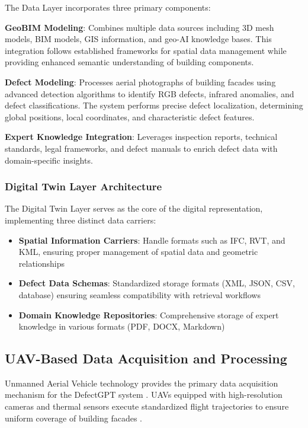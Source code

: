 The Data Layer incorporates three primary components:

\textbf{GeoBIM Modeling}: Combines multiple data sources including 3D mesh models, BIM models, GIS information, and geo-AI knowledge bases. This integration follows established frameworks for spatial data management while providing enhanced semantic understanding of building components.

\textbf{Defect Modeling}: Processes aerial photographs of building facades using advanced detection algorithms to identify RGB defects, infrared anomalies, and defect classifications. The system performs precise defect localization, determining global positions, local coordinates, and characteristic defect features.

\textbf{Expert Knowledge Integration}: Leverages inspection reports, technical standards, legal frameworks, and defect manuals to enrich defect data with domain-specific insights.

\subsubsection{Digital Twin Layer Architecture}

The Digital Twin Layer serves as the core of the digital representation, implementing three distinct data carriers:

\begin{itemize}
    \item \textbf{Spatial Information Carriers}: Handle formats such as IFC, RVT, and KML, ensuring proper management of spatial data and geometric relationships
    \item \textbf{Defect Data Schemas}: Standardized storage formats (XML, JSON, CSV, database) ensuring seamless compatibility with retrieval workflows
    \item \textbf{Domain Knowledge Repositories}: Comprehensive storage of expert knowledge in various formats (PDF, DOCX, Markdown)
\end{itemize}

\subsection{UAV-Based Data Acquisition and Processing}

Unmanned Aerial Vehicle technology provides the primary data acquisition mechanism for the DefectGPT system \cite{ribeiro2020remote,tan2021automatic}. UAVs equipped with high-resolution cameras and thermal sensors execute standardized flight trajectories to ensure uniform coverage of building facades \cite{liu2021integrating}.

